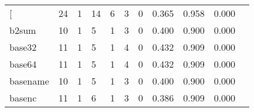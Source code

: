 \begin{longtable}{lp{1.2cm}p{1.2cm}p{1.2cm}p{1.2cm}p{1.2cm}p{1.2cm}p{1.2cm}p{1.2cm}p{1.2cm}p{1.2cm}}
\bottomrule
\endlastfoot
{[}         &                                    24 &                                                  1 &                                                 14 &                                                  6 &                                                  3 &                                                  0 &                                         0.365 &                                              0.958 &                                              0.000 \\
b2sum     &                                    10 &                                                  1 &                                                  5 &                                                  1 &                                                  3 &                                                  0 &                                         0.400 &                                              0.900 &                                              0.000 \\
base32    &                                    11 &                                                  1 &                                                  5 &                                                  1 &                                                  4 &                                                  0 &                                         0.432 &                                              0.909 &                                              0.000 \\
base64    &                                    11 &                                                  1 &                                                  5 &                                                  1 &                                                  4 &                                                  0 &                                         0.432 &                                              0.909 &                                              0.000 \\
basename  &                                    10 &                                                  1 &                                                  5 &                                                  1 &                                                  3 &                                                  0 &                                         0.400 &                                              0.900 &                                              0.000 \\
basenc    &                                    11 &                                                  1 &                                                  6 &                                                  1 &                                                  3 &                                                  0 &                                         0.386 &                                              0.909 &                                              0.000 \\

\end{longtable}
